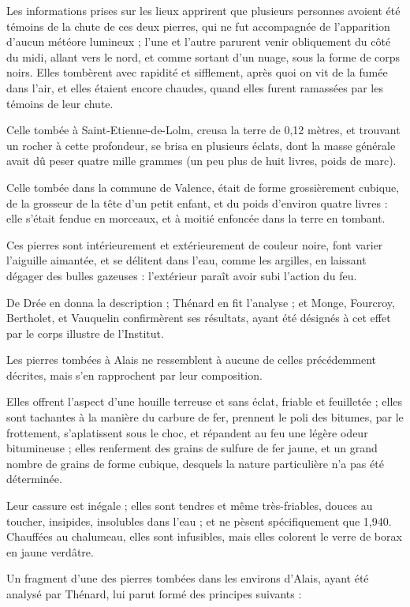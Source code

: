 \documentclass[a4paper, 12pt, oneside, french]{article}
\begin{document}
Les informations prises sur les lieux apprirent que plusieurs personnes avoient été témoins de la chute de ces deux pierres, qui ne fut accompagnée de l'apparition d'aucun météore lumineux ; l'une et l'autre parurent venir obliquement du côté du midi, allant vers le nord, et comme sortant d'un nuage, sous la forme de corps noirs. Elles tombèrent avec rapidité et sifflement, après quoi on vit de la fumée dans l'air, et elles étaient encore chaudes, quand elles furent ramassées par les témoins de leur chute.

Celle tombée à Saint-Etienne-de-Lolm, creusa la terre de 0,12 mètres, et trouvant un rocher à cette profondeur, se brisa en plusieurs éclats, dont la masse générale avait dû peser quatre mille grammes (un peu plus de huit livres, poids de marc).

Celle tombée dans la commune de Valence, était de forme grossièrement cubique, de la grosseur de la tête d'un petit enfant, et du poids d'environ quatre livres : elle s'était fendue en morceaux, et à moitié enfoncée dans la terre en tombant.

Ces pierres sont intérieurement et extérieurement de couleur noire, font varier l'aiguille aimantée, et se délitent dans l'eau, comme les argilles, en laissant dégager des bulles gazeuses : l'extérieur paraît avoir subi l'action du feu.

De Drée en donna la description ; Thénard en fit l'analyse ; et Monge, Fourcroy, Bertholet, et Vauquelin confirmèrent ses résultats, ayant été désignés à cet effet par le corps illustre de l'Institut.

Les pierres tombées à Alais ne ressemblent à aucune de celles précédemment décrites, mais s'en rapprochent par leur composition.

Elles offrent l'aspect d'une houille terreuse et sans éclat, friable et feuilletée ; elles sont tachantes à la manière du carbure de fer, prennent le poli des bitumes, par le frottement, s'aplatissent sous le choc, et répandent au feu une légère odeur bitumineuse ; elles renferment des grains de sulfure de fer jaune, et un grand nombre de grains de forme cubique, desquels la nature particulière n'a pas été déterminée.

Leur cassure est inégale ; elles sont tendres et même très-friables, douces au toucher, insipides, insolubles dans l'eau ; et ne pèsent spécifiquement que 1,940. Chauffées au chalumeau, elles sont infusibles, mais elles colorent le verre de borax en jaune verdâtre.

Un fragment d'une des pierres tombées dans les environs d'Alais, ayant été analysé par Thénard, lui parut formé des principes suivants :
\end{document}
